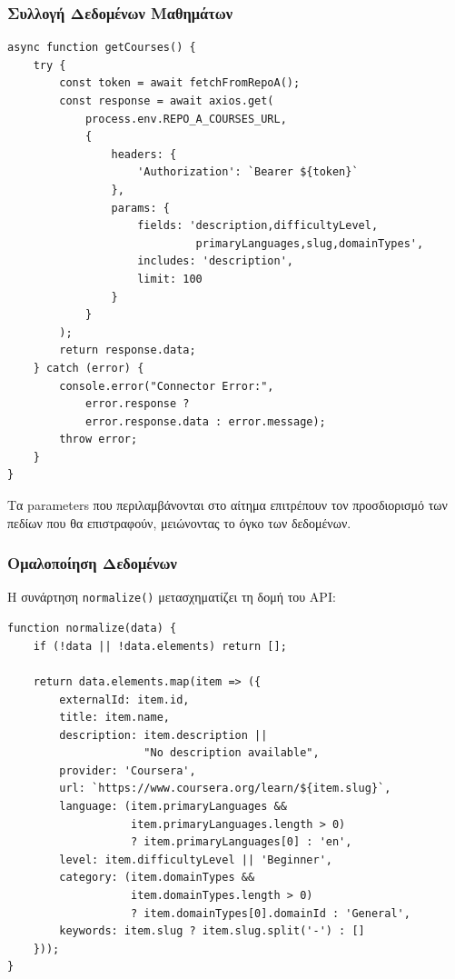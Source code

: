 \documentclass[a4paper,12pt]{article}
\begin{document}
\subsubsection{Συλλογή Δεδομένων Μαθημάτων}

\begin{verbatim}
async function getCourses() {
    try {
        const token = await fetchFromRepoA();
        const response = await axios.get(
            process.env.REPO_A_COURSES_URL, 
            {
                headers: { 
                    'Authorization': `Bearer ${token}` 
                },
                params: {
                    fields: 'description,difficultyLevel,
                             primaryLanguages,slug,domainTypes',
                    includes: 'description',
                    limit: 100
                }
            }
        );
        return response.data;
    } catch (error) {
        console.error("Connector Error:", 
            error.response ? 
            error.response.data : error.message);
        throw error;
    }
}
\end{verbatim}

Τα parameters που περιλαμβάνονται στο αίτημα επιτρέπουν τον προσδιορισμό των πεδίων που θα επιστραφούν, μειώνοντας το όγκο των δεδομένων.

\subsubsection{Ομαλοποίηση Δεδομένων}

Η συνάρτηση \texttt{normalize()} μετασχηματίζει τη δομή του API:

\begin{verbatim}
function normalize(data) {
    if (!data || !data.elements) return [];
    
    return data.elements.map(item => ({
        externalId: item.id,
        title: item.name,
        description: item.description || 
                     "No description available",
        provider: 'Coursera',
        url: `https://www.coursera.org/learn/${item.slug}`,
        language: (item.primaryLanguages && 
                   item.primaryLanguages.length > 0) 
                   ? item.primaryLanguages[0] : 'en',
        level: item.difficultyLevel || 'Beginner',
        category: (item.domainTypes && 
                   item.domainTypes.length > 0) 
                   ? item.domainTypes[0].domainId : 'General',
        keywords: item.slug ? item.slug.split('-') : []
    }));
}
\end{verbatim}
\end{document}
